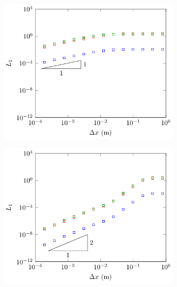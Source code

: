 \begin{figure}
	\centering
	\begin{subfigure}{0.5\textwidth}
		\includegraphics[width=\textwidth]{./chp5/figures/Analytic/Soliton/L1/FDVM1.pdf}
	\end{subfigure}%
	\begin{subfigure}{0.5\textwidth}
		\includegraphics[width=\textwidth]{./chp5/figures/Analytic/Soliton/L1/FDVM2.pdf}
	\end{subfigure}
	\begin{subfigure}{0.5\textwidth}

\end{subfigure}
\end{figure}
